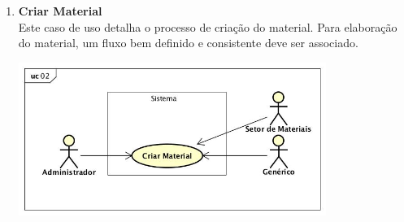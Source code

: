 \begin{enumerate}[label=\textbf{UC03}, leftmargin=2cm]
	\item \textbf{Criar Material} \\
	Este caso de uso detalha o processo de criação do material. Para elaboração do material, um fluxo bem definido e consistente deve ser associado.  \\
	\begin{minipage}[c]{10cm}
	    \includegraphics[width=10cm]{Imagens/UC_CriarMaterial.jpg}
		\label{fig:uc_criar_material}
	\end{minipage} \\


\end{enumerate}
